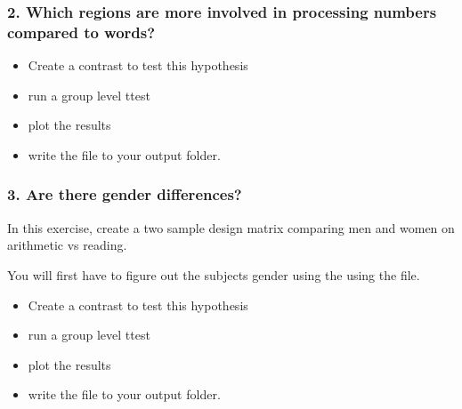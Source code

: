 \documentclass[letterpaper,10pt,english]{sphinxmanual}
\begin{document}
\subsubsection{2. Which regions are more involved in processing numbers compared to words?}
\label{\detokenize{content/Group_Analysis:which-regions-are-more-involved-in-processing-numbers-compared-to-words}}\begin{itemize}
\item {} 
Create a contrast to test this hypothesis

\item {} 
run a group level t\sphinxhyphen{}test

\item {} 
plot the results

\item {} 
write the file to your output folder.

\end{itemize}


\subsubsection{3. Are there gender differences?}
\label{\detokenize{content/Group_Analysis:are-there-gender-differences}}
In this exercise, create a two sample design matrix comparing men and women on arithmetic vs reading.

You will first have to figure out the subjects gender using the using the  file.
\begin{itemize}
\item {} 
Create a contrast to test this hypothesis

\item {} 
run a group level t\sphinxhyphen{}test

\item {} 
plot the results

\item {} 
write the file to your output folder.

\end{itemize}
\end{document}
